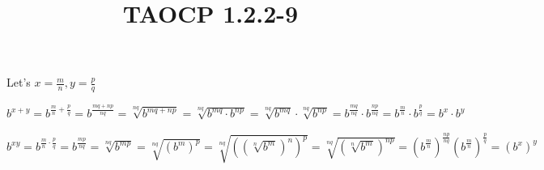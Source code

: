 \documentclass{article}
\title{TAOCP 1.2.2\mbox{-}9}
\begin{document}
\maketitle

Let's \( x = \frac{m}{n}, y = \frac{p}{q} \)

\( b^{x+y}=b^{\frac{m}{n} + \frac{p}{q}} = b^{\frac{mq+np}{nq}} = \sqrt[nq]{b^{mq+np}} = \sqrt[nq]{b^{mq} \cdot b^{np}} = \sqrt[nq]{b^{mq}} \cdot \sqrt[nq]{b^{np}} = b^{\frac{mq}{nq}} \cdot b^{\frac{np}{nq}} = b^{\frac{m}{n}} \cdot b^{\frac{p}{q}} = b^{x} \cdot b^{y} \)

\( b^{xy} = b^{\frac{m}{n}\cdot\frac{p}{q}} = b^{\frac{mp}{nq}} = \sqrt[nq]{b^{mp}} = \sqrt[nq]{{(b^{m})}^{p}} = \sqrt[nq]{{({(\sqrt[n]{b^{m}})}^{n})}^{p}} = \sqrt[nq]{{(\sqrt[n]{b^{m}})}^{np}} = {(b^{\frac{m}{n}})}^{\frac{np}{nq}} {(b^{\frac{m}{n}})}^{\frac{p}{q}} = {(b^{x})}^{y} \)
\end{document}
